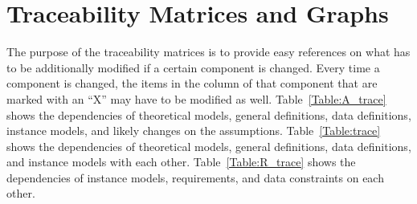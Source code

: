 \documentclass[12pt]{article}
\begin{document}
\section{Traceability Matrices and Graphs}

The purpose of the traceability matrices is to provide easy references on what
has to be additionally modified if a certain component is changed.  Every time a
component is changed, the items in the column of that component that are marked
with an ``X'' may have to be modified as well. Table~\ref{Table:A_trace} shows
the dependencies of theoretical models, general definitions, data definitions,
instance models, and likely changes on the assumptions. Table~\ref{Table:trace}
shows the dependencies of theoretical models, general definitions, data
definitions, and instance models with each other. Table~\ref{Table:R_trace}
shows the dependencies of instance models, requirements, and data constraints on
each other.
\end{document}
